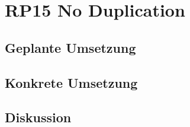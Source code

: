 \section{RP15 No Duplication}
\label{sec:principle-rp15-no-duplication}

\subsection*{Geplante Umsetzung}


\subsection*{Konkrete Umsetzung}


\subsection*{Diskussion}
